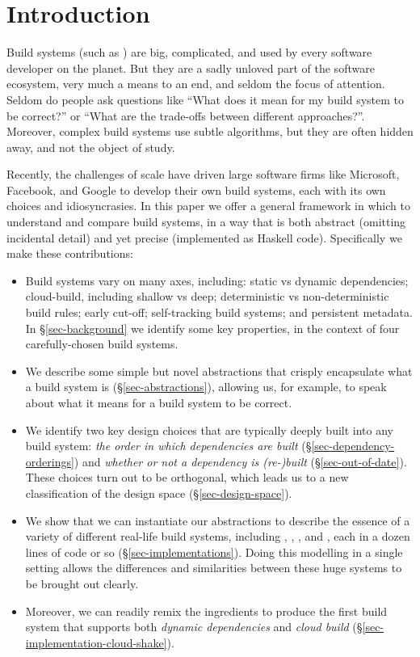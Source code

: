 \section{Introduction}\label{sec-intro}

Build systems (such as \Make) are big, complicated, and used by every
software developer on the planet.  But they are a sadly unloved part
of the software ecosystem, very much a means to an end, and seldom the
focus of attention.
Seldom do people ask questions like ``What does it mean for my build
system to be correct?'' or ``What are the trade-offs between different
approaches?''.  Moreover, complex build systems use subtle algorithms, but they
are often hidden away, and not the object of study.

Recently, the challenges of scale have driven large software firms
like Microsoft, Facebook, and Google to develop their own build
systems, each with its own choices and idiosyncrasies.
In this paper we offer a general framework in which to understand
and compare build systems,
in a way that is both abstract (omitting incidental detail)
and yet precise (implemented as Haskell code).  Specifically we make
these contributions:
\begin{itemize}
\item Build systems vary on many axes,
including: static vs dynamic dependencies; cloud-build, including
shallow vs deep; deterministic vs non-deterministic build rules;
early cut-off; self-tracking build systems; and persistent metadata.
In \S\ref{sec-background} we identify some key properties, in the context of
four carefully-chosen build systems.
\item We describe some simple but novel abstractions that
  crisply encapsulate what a build system is (\S\ref{sec-abstractions}),
  allowing us, for example, to speak about what it means for a build system to be correct.

\item We identify two key design choices
  that are typically deeply built into any build system:
  \emph{the order in which dependencies are built} (\S\ref{sec-dependency-orderings})
  and \emph{whether or not a dependency is (re-)built} (\S\ref{sec-out-of-date}).
  These choices turn out to be orthogonal, which leads us to a new
  classification of the design space (\S\ref{sec-design-space}).

\item We show that we can instantiate
our abstractions to describe the essence of a variety of different
real-life build systems, including \Make, \Shake, \Bazel, and \Excel, each in
a dozen lines of code or so (\S\ref{sec-implementations}).
Doing this modelling in a single setting allows
the differences and similarities between these huge systems to be
brought out clearly.

\item Moreover, we can readily remix the ingredients to produce the first
  build system that supports both \emph{dynamic dependencies}
  and \emph{cloud build} (\S\ref{sec-implementation-cloud-shake}).

\end{itemize}

